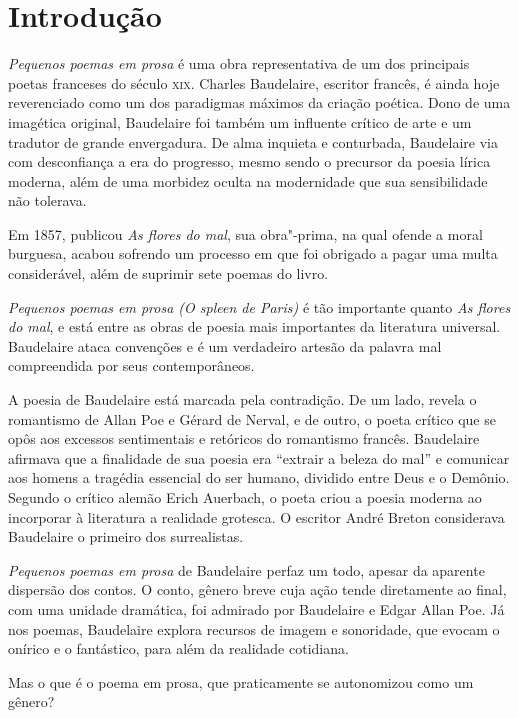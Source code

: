 \documentclass[12pt]{extarticle}
\begin{document}
\tableofcontents

\section{Introdução}

\textit{Pequenos poemas em prosa}
é uma obra representativa de um dos principais poetas franceses do
século \textsc{xix}. Charles Baudelaire, escritor francês, é ainda hoje reverenciado como um dos
paradigmas máximos da criação poética. Dono de uma imagética original,
Baudelaire foi também um influente crítico de
arte e um tradutor de grande envergadura. De alma inquieta e conturbada, 
Baudelaire via com desconfiança a era do
progresso, mesmo sendo o precursor da poesia lírica moderna, 
além de uma morbidez oculta na modernidade que sua sensibilidade não tolerava.

 
Em 1857, publicou \textit{As flores do mal}, sua
obra"-prima, na qual ofende a moral burguesa, acabou sofrendo um processo em
que foi obrigado a pagar uma multa considerável, além de suprimir sete poemas
do livro. 

\textit{Pequenos poemas em prosa (O spleen de Paris)} é tão importante quanto 
\textit{As flores do mal}, e está entre as obras de poesia mais importantes da 
literatura universal. Baudelaire ataca convenções e é um verdadeiro artesão 
da palavra mal compreendida por seus contemporâneos. 

A poesia de Baudelaire está marcada pela
contradição. De um lado, revela o romantismo de Allan Poe e Gérard de Nerval, e
de outro, o poeta crítico que se opôs aos excessos sentimentais e retóricos do
romantismo francês.
Baudelaire afirmava que a finalidade de sua poesia era “extrair a beleza do
mal” e comunicar aos homens a tragédia essencial do ser humano, dividido entre
Deus e o Demônio.  Segundo o crítico alemão Erich Auerbach, o poeta criou a
poesia moderna ao incorporar à literatura a realidade grotesca. O escritor
André Breton considerava Baudelaire o primeiro dos surrealistas.
 
\textit{Pequenos poemas em prosa} de Baudelaire perfaz um todo, 
apesar da aparente dispersão dos contos. O conto, gênero breve cuja 
ação tende diretamente ao final, com uma unidade
dramática, foi admirado por Baudelaire e Edgar Allan Poe.
Já nos poemas, Baudelaire explora recursos de imagem e sonoridade, que evocam o
onírico e o fantástico, para além da realidade cotidiana.

Mas o que é o poema em prosa, que praticamente se autonomizou como um
gênero?
 
\end{document}
